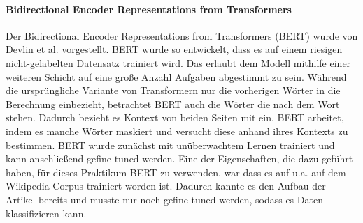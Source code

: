 \paragraph{Bidirectional Encoder Representations from Transformers}
Der Bidirectional Encoder Representations from Transformers (BERT) wurde von Devlin et al. \cite{Devlin2018} vorgestellt. BERT wurde so entwickelt, dass es auf einem riesigen nicht-gelabelten Datensatz trainiert wird. Das erlaubt dem Modell mithilfe einer weiteren Schicht auf eine große Anzahl Aufgaben abgestimmt zu sein. Während die ursprüngliche Variante von Transformern nur die vorherigen Wörter in die Berechnung einbezieht, betrachtet BERT auch die Wörter die nach dem Wort stehen. Dadurch bezieht es Kontext von beiden Seiten mit ein. BERT arbeitet, indem es manche Wörter maskiert und versucht diese anhand ihres Kontexts zu bestimmen. BERT wurde zunächst mit unüberwachtem Lernen trainiert und kann anschließend gefine-tuned werden. Eine der Eigenschaften, die dazu geführt haben, für dieses Praktikum BERT zu verwenden, war dass es auf u.a. auf dem Wikipedia Corpus trainiert worden ist. Dadurch kannte es den Aufbau der Artikel bereits und musste nur noch gefine-tuned werden, sodass es Daten klassifizieren kann.